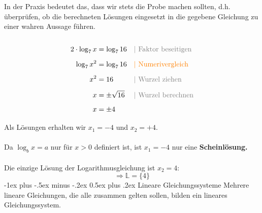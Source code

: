 \documentclass[10pt,landscape]{article}
\makeatletter
\renewcommand{\section}{\@startsection{section}{1}{0mm}%
                                {-1ex plus -.5ex minus -.2ex}%
                                {0.5ex plus .2ex}%
                                {\normalfont\large\bfseries}}
\makeatother
\begin{document}
\begin{multicols}{3}
    In der Praxis bedeutet das, dass wir stets die Probe machen sollten, d.h. überprüfen, ob die berechneten Lösungen eingesetzt in die gegebene Gleichung zu einer wahren Aussage führen.\\~\\
    \begin{align*} 2 \cdot \log_{7}x &= \log_{7}16 &&{\color{gray}|\text{ Faktor beseitigen}} \\[5px] \log_{7}x^2 &= \log_{7}16 &&{\color{orange}|\text{ Numerivergleich}} \\[5px] x^2 &= 16 &&{\color{gray}|\text{ Wurzel ziehen}} \\[5px] x &= \pm \sqrt{16} &&{\color{gray}|\text{ Wurzel berechnen}} \\[5px] x &= \pm 4 \\[5px] \end{align*}
    Als Lösungen erhalten wir $x_1 = -4$ und $x_2 = +4$.\\~\\

    Da $\log_{b}x = a$ nur für $x > 0$ definiert ist, ist $x_1 = -4$ nur eine \textbf{Scheinlösung.}\\~\\

    Die einzige Lösung der Logarithmusgleichung ist $x_2 = 4$:\\
    \[\Rightarrow \mathbb{L} = \{4\}\]
    \section{Lineare Gleichungs­systeme}
    Mehrere lineare Gleichungen, die alle zusammen gelten sollen, bilden ein lineares Gleichungssystem.\\

\end{multicols}
\end{document}
